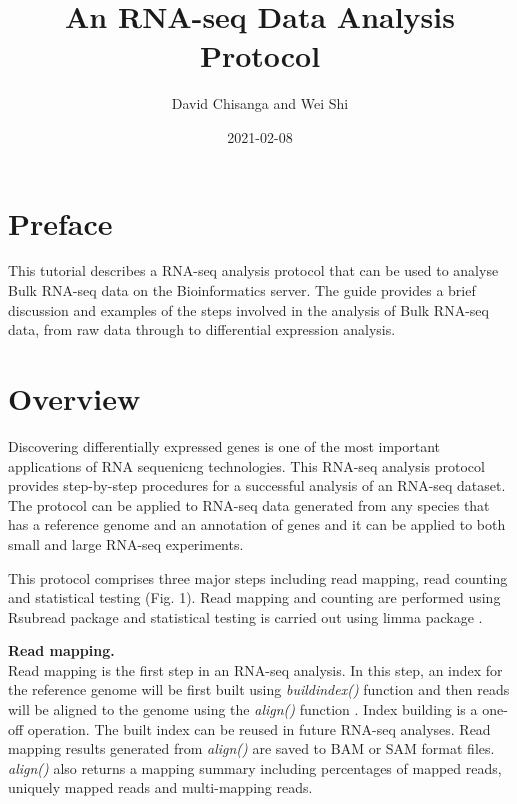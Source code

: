 \documentclass[]{book}
\title{An RNA-seq Data Analysis Protocol}
\author{David Chisanga and Wei Shi}
\date{2021-02-08}
\begin{document}
\maketitle

{
\setcounter{tocdepth}{1}
\tableofcontents
}
\hypertarget{preface}{%
\chapter*{Preface}\label{preface}}

This tutorial describes a RNA-seq analysis protocol that can be used to analyse Bulk RNA-seq data on the Bioinformatics server. The guide provides a brief discussion and examples of the steps involved in the analysis of Bulk RNA-seq data, from raw data through to differential expression analysis.

\hypertarget{intro}{%
\chapter{Overview}\label{intro}}

Discovering differentially expressed genes is one of the most important applications of RNA sequenicng technologies. This RNA-seq analysis protocol provides step-by-step procedures for a successful analysis of an RNA-seq dataset. The protocol can be applied to RNA-seq data generated
from any species that has a reference genome and an annotation of genes and it can be applied to both small and large RNA-seq experiments.

This protocol comprises three major steps including read mapping, read counting and statistical testing (Fig. 1). Read mapping and counting are performed using Rsubread package \citep{Rsubread2019} and statistical testing is carried out using limma package \citep{limma2015}.

\textbf{Read mapping.}\\
Read mapping is the first step in an RNA-seq analysis. In this step, an index for the reference genome will be first built using \emph{buildindex()} function and then reads will be aligned to the genome using the \emph{align()} function \citep{Rsubread2019, liao2013subread}. Index building is a one-off operation. The built index can be reused in future RNA-seq analyses.
Read mapping results generated from \emph{align()} are saved to BAM or SAM format files. \emph{align()} also returns a mapping summary including percentages of mapped reads, uniquely mapped reads and multi-mapping reads.
\end{document}
